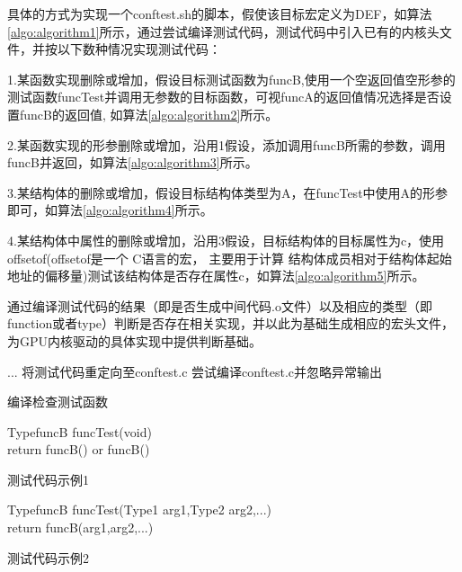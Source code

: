 具体的方式为实现一个conftest.sh的脚本，假使该目标宏定义为DEF，如算法\ref{algo:algorithm1}所示，通过尝试编译测试代码，测试代码中引入已有的内核头文件，并按以下数种情况实现测试代码：

1.某函数实现删除或增加，假设目标测试函数为funcB,使用一个空返回值空形参的测试函数funcTest并调用无参数的目标函数，可视funcA的返回值情况选择是否设置funcB的返回值,
如算法\ref{algo:algorithm2}所示。

2.某函数实现的形参删除或增加，沿用1假设，添加调用funcB所需的参数，调用funcB并返回，如算法\ref{algo:algorithm3}所示。

3.某结构体的删除或增加，假设目标结构体类型为A，在funcTest中使用A的形参即可，如算法\ref{algo:algorithm4}所示。

4.某结构体中属性的删除或增加，沿用3假设，目标结构体的目标属性为c，使用offsetof(offsetof是一个 C语言的宏，
主要用于计算 结构体成员相对于结构体起始地址的偏移量)测试该结构体是否存在属性c，如算法\ref{algo:algorithm5}所示。

通过编译测试代码的结果（即是否生成中间代码.o文件）以及相应的类型（即function或者type）判断是否存在相关实现，并以此为基础生成相应的宏头文件，为GPU内核驱动的具体实现中提供判断基础。

\begin{algorithm}[h]
  \SetAlgoLined
  ...\;
  将测试代码重定向至conftest.c\;
  尝试编译conftest.c并忽略异常输出\;
  \caption{编译检查测试函数}
  \label{algo:algorithm1}
\end{algorithm}

\begin{minipage}{0.45\textwidth}
  \begin{algorithm}[H]
    \SetAlgoLined
    TypefuncB funcTest(void){\\
      return funcB()\;
      or \;
      funcB()\;
    }
    \caption{测试代码示例1}
    \label{algo:algorithm2}
  \end{algorithm}
\end{minipage}
\hfill
\begin{minipage}{0.45\textwidth}
  \begin{algorithm}[H]
    \SetAlgoLined
    TypefuncB funcTest(Type1 arg1,Type2 arg2,...){\\
      return funcB(arg1,arg2,...)\;
    }
    \caption{测试代码示例2}
    \label{algo:algorithm3}
  \end{algorithm}
\end{minipage}

